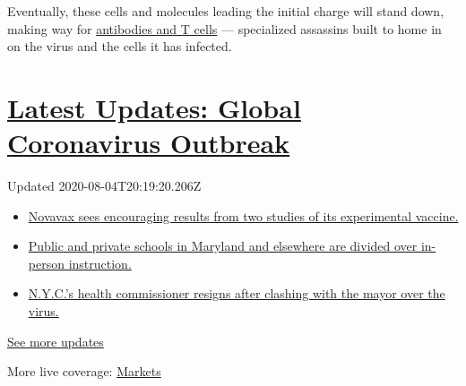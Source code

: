 Eventually, these cells and molecules leading the initial charge will
stand down, making way for
\href{https://www.nytimes3xbfgragh.onion/2020/07/26/health/coronvirus-antibody-tests.html}{antibodies
and T cells} --- specialized assassins built to home in on the virus and
the cells it has infected.

\hypertarget{latest-updates-global-coronavirus-outbreak}{%
\section{\texorpdfstring{\href{https://www.nytimes3xbfgragh.onion/2020/08/04/world/coronavirus-cases.html?action=click\&pgtype=Article\&state=default\&region=MAIN_CONTENT_1\&context=storylines_live_updates}{Latest
Updates: Global Coronavirus
Outbreak}}{Latest Updates: Global Coronavirus Outbreak}}\label{latest-updates-global-coronavirus-outbreak}}

Updated 2020-08-04T20:19:20.206Z

\begin{itemize}
\tightlist
\item
  \href{https://www.nytimes3xbfgragh.onion/2020/08/04/world/coronavirus-cases.html?action=click\&pgtype=Article\&state=default\&region=MAIN_CONTENT_1\&context=storylines_live_updates\#link-1228a480}{Novavax
  sees encouraging results from two studies of its experimental
  vaccine.}
\item
  \href{https://www.nytimes3xbfgragh.onion/2020/08/04/world/coronavirus-cases.html?action=click\&pgtype=Article\&state=default\&region=MAIN_CONTENT_1\&context=storylines_live_updates\#link-4825b93}{Public
  and private schools in Maryland and elsewhere are divided over
  in-person instruction.}
\item
  \href{https://www.nytimes3xbfgragh.onion/2020/08/04/world/coronavirus-cases.html?action=click\&pgtype=Article\&state=default\&region=MAIN_CONTENT_1\&context=storylines_live_updates\#link-4d1eafa8}{N.Y.C.'s
  health commissioner resigns after clashing with the mayor over the
  virus.}
\end{itemize}

\href{https://www.nytimes3xbfgragh.onion/2020/08/04/world/coronavirus-cases.html?action=click\&pgtype=Article\&state=default\&region=MAIN_CONTENT_1\&context=storylines_live_updates}{See
more updates}

More live coverage:
\href{https://www.nytimes3xbfgragh.onion/live/2020/08/04/business/stock-market-today-coronavirus?action=click\&pgtype=Article\&state=default\&region=MAIN_CONTENT_1\&context=storylines_live_updates}{Markets}

